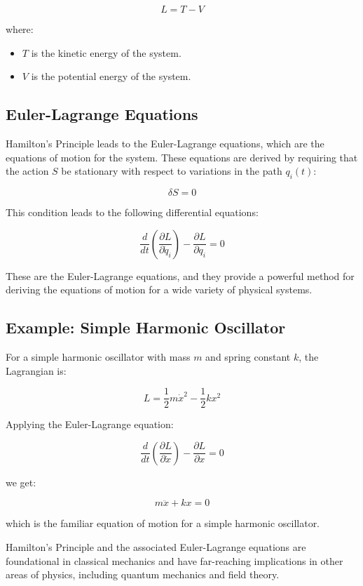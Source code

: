 \documentclass[
  a4paper,
]{book}
\begin{document}
\begin{tcolorbox}
\[
L = T - V
\]

where:

\begin{itemize}
\item
  \(T\) is the kinetic energy of the system.
\item
  \(V\) is the potential energy of the system.
\end{itemize}

\subsection{Euler-Lagrange Equations}\label{euler-lagrange-equations}

Hamilton's Principle leads to the Euler-Lagrange equations, which are
the equations of motion for the system. These equations are derived by
requiring that the action \(S\) be stationary with respect to variations
in the path \(q_i(t)\):

\[
\delta S = 0
\]

This condition leads to the following differential equations:

\[
\frac{d}{dt} \left( \frac{\partial L}{\partial \dot{q}_i} \right) - \frac{\partial L}{\partial q_i} = 0
\]

These are the Euler-Lagrange equations, and they provide a powerful
method for deriving the equations of motion for a wide variety of
physical systems.

\subsection{Example: Simple Harmonic
Oscillator}\label{example-simple-harmonic-oscillator}

For a simple harmonic oscillator with mass \(m\) and spring constant
\(k\), the Lagrangian is:

\[
L = \frac{1}{2} m \dot{x}^2 - \frac{1}{2} k x^2
\]

Applying the Euler-Lagrange equation:

\[
\frac{d}{dt} \left( \frac{\partial L}{\partial \dot{x}} \right) - \frac{\partial L}{\partial x} = 0
\]

we get:

\[
m \ddot{x} + k x = 0
\]

which is the familiar equation of motion for a simple harmonic
oscillator.

Hamilton's Principle and the associated Euler-Lagrange equations are
foundational in classical mechanics and have far-reaching implications
in other areas of physics, including quantum mechanics and field theory.

\end{tcolorbox}
\end{document}
